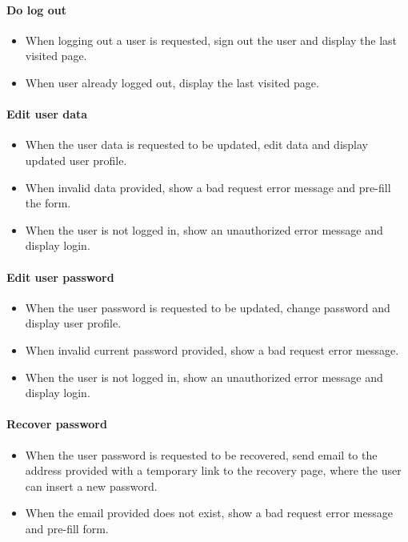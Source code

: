 \begin{appendices}
\paragraph{Do log out}
\begin{itemize}
	\item When logging out a user is requested, sign out the user and display the last visited page.
	\item When user already logged out, display the last visited page.
\end{itemize}

\paragraph{Edit user data}
\begin{itemize}
	\item When the user data is requested to be updated, edit data and display updated user profile.
	\item When invalid data provided, show a bad request error message and pre-fill the form.
	\item When the user is not logged in, show an unauthorized error message and display login.
\end{itemize}

\paragraph{Edit user password}
\begin{itemize}
	\item When the user password is requested to be updated, change password and display user profile.
	\item When invalid current password provided, show a bad request error message.
	\item When the user is not logged in, show an unauthorized error message and display login.
\end{itemize}

\paragraph{Recover password}
\begin{itemize}
	\item When the user password is requested to be recovered, send email to the address provided with a temporary link to the recovery page, where the user can insert a new password.
	\item When the email provided does not exist, show a bad request error message and pre-fill form.
\end{itemize}


\end{appendices}
